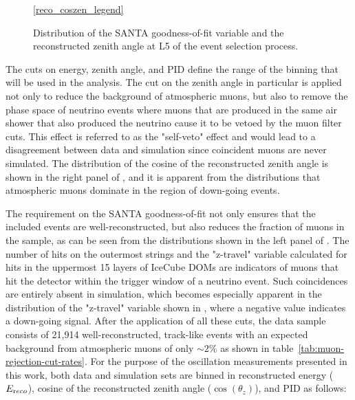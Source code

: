 \begin{figure}
    \centering
    \ref{reco_coszen_legend}\par
    
    
    \caption{Distribution of the SANTA goodness-of-fit variable and the reconstructed zenith angle at L5 of the event selection process.}
    \label{fig:final_cut_vars_l5}
\end{figure}

The cuts on energy, zenith angle, and PID define the range of the binning that will be used in the analysis. The cut on the zenith angle in particular is applied not only to reduce the background of atmospheric muons, but also to remove the phase space of neutrino events where muons that are produced in the same air shower that also produced the neutrino cause it to be vetoed by the muon filter cuts. This effect is referred to as the "self-veto" effect and would lead to a disagreement between data and simulation since coincident muons are never simulated. The distribution of the cosine of the reconstructed zenith angle is shown in the right panel of , and it is apparent from the distributions that atmospheric muons dominate in the region of down-going events.

The requirement on the SANTA goodness-of-fit not only ensures that the included events are well-reconstructed, but also reduces the fraction of muons in the sample, as can be seen from the distributions shown in the left panel of . The number of hits on the outermost strings and the "z-travel" variable calculated for hits in the uppermost 15 layers of IceCube DOMs are indicators of muons that hit the detector within the trigger window of a neutrino event. Such coincidences are entirely absent in simulation, which becomes especially apparent in the distribution of the "z-travel" variable shown in , where a negative value indicates a down-going signal. After the application of all these cuts, the data sample consists of 21,914 well-reconstructed, track-like events with an expected background from atmospheric muons of only $\sim 2\%$ as shown in table~\ref{tab:muon-rejection-cut-rates}. For the purpose of the oscillation measurements presented in this work, both data and simulation sets are binned in reconstructed energy ($E_{\rm reco}$), cosine of the reconstructed zenith angle ($\cos(\theta_z)$), and PID as follows:

